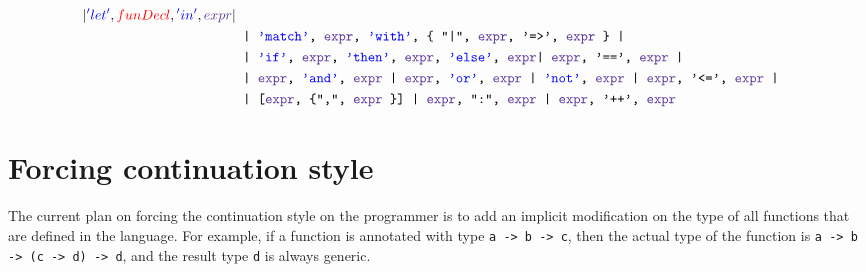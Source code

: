 \documentclass{article}
\begin{document}
\begin{align*}
{	%
	| \color{blue}'let'\color{black}, \color{red}funDecl\color{black}, \color{blue}'in'\color{black}, \color{RoyalPurple}expr \color{black} 
|}\\
&\texttt{
	| \color{blue}'match'\color{black}, \color{RoyalPurple}expr\color{black}, \color{blue}'with'\color{black}, \{ "|", \color{RoyalPurple}expr\color{black}, '=>', \color{RoyalPurple}expr \color{black} \}
|}\\
&\texttt{
	| \color{blue}'if'\color{black}, \color{RoyalPurple}expr\color{black}, \color{blue}'then'\color{black}, \color{RoyalPurple}expr\color{black}, \color{blue}'else'\color{black}, \color{RoyalPurple}expr\color{black}
	| \color{RoyalPurple}expr\color{black}, '==',
	\color{RoyalPurple}expr \color{black}
|}\\
&\texttt{
	| \color{RoyalPurple}expr\color{black}, \color{blue}'and'\color{black}, \color{RoyalPurple}expr \color{black}
	| \color{RoyalPurple}expr\color{black}, \color{blue} 'or'\color{black}, \color{RoyalPurple}expr \color{black}
	| \color{blue} 'not'\color{black}, \color{RoyalPurple}expr \color{black} 
	| \color{RoyalPurple}expr\color{black}, '<=', \color{RoyalPurple}expr \color{black}
|}\\
&\texttt{
	| [\color{RoyalPurple}expr\color{black}, \{",", \color{RoyalPurple}expr \color{black}\}]
	| \color{RoyalPurple} expr\color{black}, ":", \color{RoyalPurple}expr \color{black}
	| \color{RoyalPurple}expr\color{black}, '++', \color{RoyalPurple}expr \color{black}
}
\end{align*}
\section{Forcing continuation style}
The current plan on forcing the continuation style on the programmer is to add an implicit modification on the type of all functions that are defined in the language. For example, if a function is annotated with type \texttt{a -> b -> c}, then the actual type of the function is \texttt{a -> b -> (c -> d) -> d}, and the result type \texttt{d} is always generic.
\end{document}
